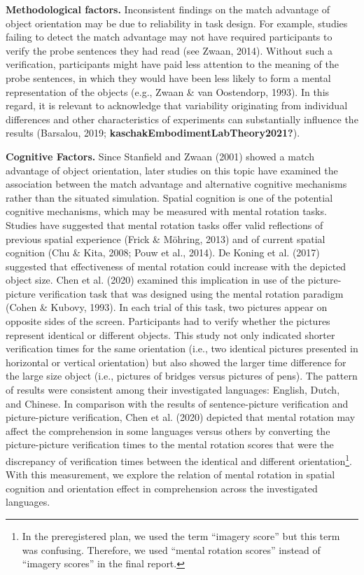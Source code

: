 \documentclass[
  man]{apa7}
\begin{document}
\textbf{Methodological factors.} Inconsistent findings on the match advantage of object orientation may be due to reliability in task design. For example, studies failing to detect the match advantage may not have required participants to verify the probe sentences they had read (see Zwaan, 2014). Without such a verification, participants might have paid less attention to the meaning of the probe sentences, in which they would have been less likely to form a mental representation of the objects (e.g., Zwaan \& van Oostendorp, 1993). In this regard, it is relevant to acknowledge that variability originating from individual differences and other characteristics of experiments can substantially influence the results (Barsalou, 2019; \textbf{kaschakEmbodimentLabTheory2021?}).

\textbf{Cognitive Factors.} Since Stanfield and Zwaan (2001) showed a match advantage of object orientation, later studies on this topic have examined the association between the match advantage and alternative cognitive mechanisms rather than the situated simulation. Spatial cognition is one of the potential cognitive mechanisms, which may be measured with mental rotation tasks. Studies have suggested that mental rotation tasks offer valid reflections of previous spatial experience (Frick \& Möhring, 2013) and of current spatial cognition (Chu \& Kita, 2008; Pouw et al., 2014). De Koning et al. (2017) suggested that effectiveness of mental rotation could increase with the depicted object size. Chen et al. (2020) examined this implication in use of the picture-picture verification task that was designed using the mental rotation paradigm (Cohen \& Kubovy, 1993). In each trial of this task, two pictures appear on opposite sides of the screen. Participants had to verify whether the pictures represent identical or different objects. This study not only indicated shorter verification times for the same orientation (i.e., two identical pictures presented in horizontal or vertical orientation) but also showed the larger time difference for the large size object (i.e., pictures of bridges versus pictures of pens). The pattern of results were consistent among their investigated languages: English, Dutch, and Chinese. In comparison with the results of sentence-picture verification and picture-picture verification, Chen et al. (2020) depicted that mental rotation may affect the comprehension in some languages versus others by converting the picture-picture verification times to the mental rotation scores that were the discrepancy of verification times between the identical and different orientation\footnote{In the preregistered plan, we used the term ``imagery score'' but this term was confusing. Therefore, we used ``mental rotation scores'' instead of ``imagery scores'' in the final report.}. With this measurement, we explore the relation of mental rotation in spatial cognition and orientation effect in comprehension across the investigated languages.
\end{document}
